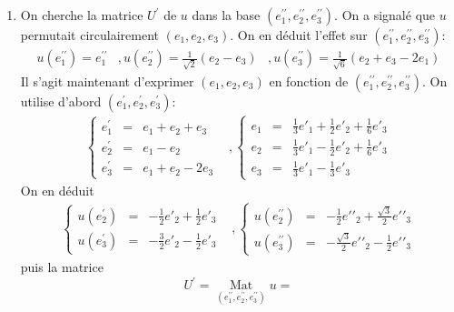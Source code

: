 \begin{enumerate}
\begin{enumerate}
\item On cherche la matrice $U^{\prime}$ de $u$ dans la base $(e^{\prime\prime}_1,e^{\prime\prime}_2,e^{\prime\prime}_3)$.\newline
On a signalé que $u$ permutait circulairement $(e_1,e_2,e_3)$. On en déduit l'effet sur $(e^{\prime\prime}_1,e^{\prime\prime}_2,e^{\prime\prime}_3)$:
\begin{eqnarray*}
u(e^{\prime\prime}_1)=e^{\prime\prime}_1&, 
u(e^{\prime\prime}_2)=\frac{1}{\sqrt{2}}(e_2-e_3)&,
u(e^{\prime\prime}_3)=\frac{1}{\sqrt{6}}(e_2+e_3-2e_1)
\end{eqnarray*}
Il s'agit maintenant d'exprimer $(e_1,e_2,e_3)$ en fonction de $(e^{\prime\prime}_1,e^{\prime\prime}_2,e^{\prime\prime}_3)$. On utilise d'abord $(e^{\prime}_1,e^{\prime}_2,e^{\prime}_3)$:
\begin{eqnarray*}
\left\lbrace \begin{array}{lcl}
e^{\prime}_1 & = & e_1+e_2+e_3\\ 
e^{\prime}_2 & = & e_1-e_2\\
e^{\prime}_3 & = & e_1+e_2-2e_3 
\end{array}\right.
&,
\left\lbrace \begin{array}{lcl}
e_1 & = & \frac{1}{3}e{\prime}_1 + \frac{1}{2}e{\prime}_2 + \frac{1}{6}e{\prime}_3\\
e_2 & = & \frac{1}{3}e{\prime}_1 - \frac{1}{2}e{\prime}_2 + \frac{1}{6}e{\prime}_3\\
e_3 & = & \frac{1}{3}e{\prime}_1 - \frac{1}{3}e{\prime}_3 
\end{array}\right.
\end{eqnarray*}
On en déduit
\begin{eqnarray*}
\left\lbrace \begin{array}{lcl}
u(e^{\prime}_2) & = & -\frac{1}{2}e{\prime}_2 + \frac{1}{2}e{\prime}_3\\
u(e^{\prime}_3) & = & -\frac{3}{2}e{\prime}_2 - \frac{1}{2}e{\prime}_3 
\end{array}\right.
&,
\left\lbrace \begin{array}{lcl}
u(e^{\prime\prime}_2) & = & -\frac{1}{2}e{\prime\prime}_2 + \frac{\sqrt{3}}{2}e{\prime\prime}_3\\
u(e^{\prime\prime}_3) & = & -\frac{\sqrt{3}}{2}e{\prime\prime}_2 - \frac{1}{2}e{\prime\prime}_3 
\end{array}\right.
\end{eqnarray*}
puis la matrice
\[U^{\prime}=\underset{(e^{\prime\prime}_1,e^{\prime\prime}_2,e^{\prime\prime}_3)}{\mathop{\mathrm{Mat}}}u=
\]
\end{enumerate}
\end{enumerate}
